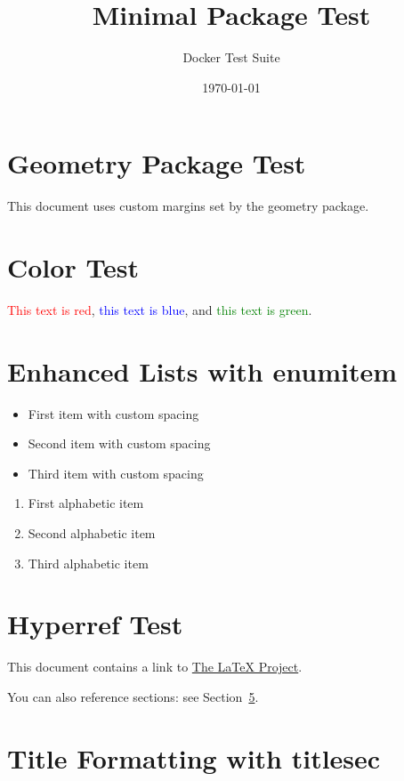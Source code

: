 \documentclass{article}
\title{Minimal Package Test}
\author{Docker Test Suite}
\date{\today}
\begin{document}
    \maketitle

    \section{Geometry Package Test}
    This document uses custom margins set by the geometry package.

    \section{Color Test}
    \textcolor{red}{This text is red}, \textcolor{blue}{this text is blue}, and \textcolor{green}{this text is green}.

    \section{Enhanced Lists with enumitem}
    \begin{itemize}[label=\textbullet, itemsep=0.5em]
        \item First item with custom spacing
        \item Second item with custom spacing
        \item Third item with custom spacing
    \end{itemize}

    \begin{enumerate}[label=(\alph*), start=1]
        \item First alphabetic item
        \item Second alphabetic item
        \item Third alphabetic item
    \end{enumerate}

    \section{Hyperref Test}
    This document contains a link to \href{https://www.latex-project.org/}{The LaTeX Project}.

    You can also reference sections: see Section~\ref{sec:titlesec}.

    \section{Title Formatting with titlesec}
    \label{sec:titlesec}
\end{document}
